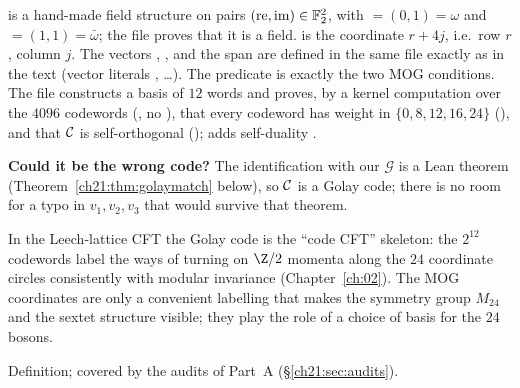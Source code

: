 \begin{dictionary}
 is a hand-made field structure on pairs $(\mathrm{re},\mathrm{im})\in\mathbb{F}_2^2$, with
 $=(0,1)=\omega$ and  $=(1,1)=\bar\omega$; the file proves that it is a field.
 is the coordinate $r+4j$, i.e.\ row $r$, column $j$.  The vectors ,
,  and the span  are defined in the same file exactly as in the text
(vector literals \lean{![1, 0, 0, 1, ᾱ, α]}, \dots).  The predicate is exactly the two MOG conditions.  The file constructs a basis  of $12$
words and proves, by a kernel computation over the $4096$ codewords (, no
), that every codeword has weight in $\{0,8,12,16,24\}$ (),
and that $\mathcal{C}$ is self-orthogonal ();
 adds self-duality .

\textbf{Could it be the wrong code?}  The identification with our $\mathcal G$ is a Lean theorem
(Theorem~\ref{ch21:thm:golaymatch} below), so $\mathcal{C}$ is a Golay code; there is no room for a
typo in $v_1,v_2,v_3$ that would survive that theorem.
\end{dictionary}
\begin{physics}
In the Leech-lattice CFT the Golay code is the ``code CFT'' skeleton: the $2^{12}$ codewords label
the ways of turning on $\Z/2$ momenta along the $24$ coordinate circles consistently with modular
invariance (Chapter~\ref{ch:02}).  The MOG coordinates are only a convenient labelling that makes the
symmetry group $M_{24}$ and the sextet structure visible; they play the role of a choice of basis
for the $24$ bosons.
\end{physics}
\begin{status}
Definition; covered by the audits of Part~A (\S\ref{ch21:sec:audits}).
\end{status}

